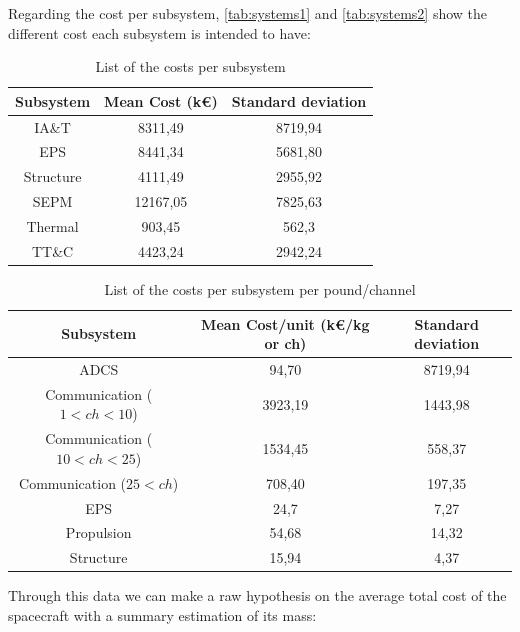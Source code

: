 \documentclass[11pt,a4paper,titlepage]{article}
\begin{document}
Regarding the cost per subsystem, \autoref{tab:systems1} and \autoref{tab:systems2} show the different cost each subsystem is intended to have:

\begin{table}
\centering
\begin{tabular}{ccc}
\toprule
Subsystem & Mean Cost (k\euro) & Standard deviation\\
\midrule
IA\&T     & 8311,49   & 8719,94\\
EPS        & 8441,34   & 5681,80\\
Structure & 4111,49   & 2955,92\\
SEPM      & 12167,05 & 7825,63\\
Thermal  & 903,45    & 562,3\\
TT\&C    & 4423,24   & 2942,24\\ 
\bottomrule
\end{tabular}
\caption{List of the costs per subsystem}
\label{tab:systems1}
\end{table}

\begin{table}
\centering
\begin{tabular}{ccc}
\toprule
Subsystem & Mean Cost/unit (k\euro/kg or ch) & Standard deviation\\
\midrule
ADCS                                         & 94,70     & 8719,94\\
Communication ($1 < ch < 10$)   & 3923,19 & 1443,98\\
Communication ($10 < ch < 25$) & 1534,45 & 558,37\\
Communication ($25 < ch$)         & 708,40   & 197,35\\
EPS                                            & 24,7      & 7,27\\
Propulsion                                  & 54,68     & 14,32\\
Structure                                    & 15,94     & 4,37\\
\bottomrule
\end{tabular}
\caption{List of the costs per subsystem per pound/channel}
\label{tab:systems2}
\end{table}

Through this data we can make a raw hypothesis on the average total cost of the spacecraft with a summary estimation of its mass:
\end{document}
